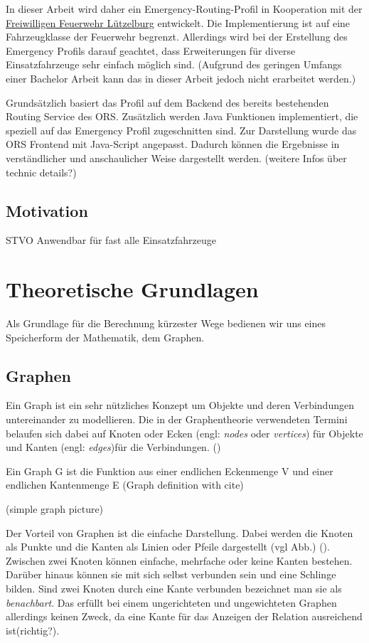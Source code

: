 \documentclass[10pt,a4paper]{article}
\begin{document}
In dieser Arbeit wird daher ein Emergency-Routing-Profil in Kooperation mit der \href{https://www.feuerwehr-luetzelburg.de}{Freiwilligen Feuerwehr Lützelburg} entwickelt. Die Implementierung ist auf eine Fahrzeugklasse der Feuerwehr begrenzt. Allerdings wird bei der Erstellung des Emergency Profils darauf geachtet, dass Erweiterungen für diverse Einsatzfahrzeuge sehr einfach möglich sind. (Aufgrund des geringen Umfangs einer Bachelor Arbeit kann das in dieser Arbeit jedoch nicht erarbeitet werden.)


Grundsätzlich basiert das Profil auf dem Backend des bereits bestehenden Routing Service des ORS. Zusätzlich werden Java Funktionen implementiert, die speziell auf das Emergency Profil zugeschnitten sind. Zur Darstellung wurde das ORS Frontend mit Java-Script angepasst. Dadurch können die Ergebnisse in verständlicher und anschaulicher Weise dargestellt werden.
(weitere Infos über technic details?)

\subsection{Motivation}

STVO
Anwendbar für fast alle Einsatzfahrzeuge 

\section{Theoretische Grundlagen}

Als Grundlage für die Berechnung kürzester Wege bedienen wir uns eines Speicherform der Mathematik, dem Graphen.

\subsection{Graphen}

Ein Graph ist ein sehr nützliches Konzept um Objekte und deren Verbindungen untereinander zu modellieren. Die in der Graphentheorie verwendeten Termini belaufen sich dabei auf Knoten oder Ecken (engl: \textit{nodes} oder \textit{vertices}) für Objekte und Kanten (engl: \textit{edges})für die Verbindungen.
(\cite[49]{kurt})

Ein Graph G ist die Funktion aus einer endlichen Eckenmenge V und einer endlichen Kantenmenge E
(Graph definition with cite)


(simple graph picture)

Der Vorteil von Graphen ist die einfache Darstellung. Dabei werden die Knoten als Punkte und die Kanten als Linien oder Pfeile dargestellt (vgl Abb.) (\cite[49]{kurt}). Zwischen zwei Knoten können einfache, mehrfache oder keine Kanten bestehen. Darüber hinaus können sie mit sich selbst verbunden sein und eine Schlinge bilden. Sind zwei Knoten durch eine Kante verbunden bezeichnet man sie als \textit{benachbart}. Das erfüllt bei einem ungerichteten und ungewichteten Graphen allerdings keinen Zweck, da eine Kante für das Anzeigen der Relation ausreichend ist(richtig?).
\end{document}
